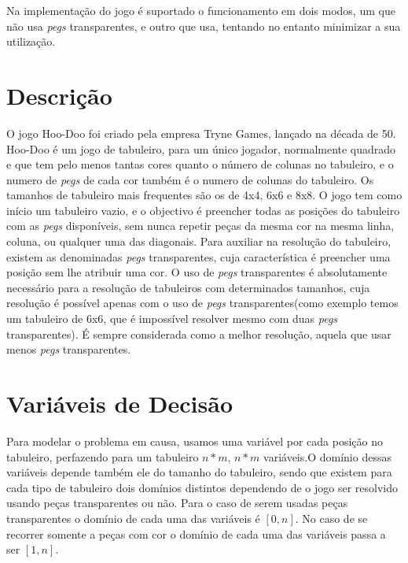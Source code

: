 \documentclass{llncs}
\begin{document}
Na implementa\c{c}\~{a}o do jogo \'{e} suportado o funcionamento em dois modos, um que n\~{a}o usa \emph{pegs} transparentes, e outro que usa, tentando no entanto minimizar a sua utiliza\c{c}\~{a}o.

%

\section{Descri\c{c}\~{a}o}
%
O jogo Hoo-Doo foi criado pela empresa Tryne Games, lan\c{c}ado na d\'{e}cada de 50. Hoo-Doo \'{e} um jogo de tabuleiro, para um \'{u}nico jogador, normalmente quadrado e que tem pelo menos tantas cores quanto o n\'{u}mero de colunas no tabuleiro, e o numero de \emph{\emph{pegs}} de cada cor tamb\'{e}m \'{e} o numero de colunas do tabuleiro. Os tamanhos de tabuleiro mais frequentes s\~{a}o os de 4x4, 6x6 e 8x8. O jogo tem como in\'{i}cio um tabuleiro vazio, e o objectivo \'{e} preencher todas as posi\c{c}\~{o}es do tabuleiro com as \emph{pegs} dispon\'{i}veis, sem nunca repetir pe\c{c}as da mesma cor na mesma linha, coluna, ou qualquer uma das diagonais. Para auxiliar na resolu\c{c}\~{a}o do tabuleiro, existem as denominadas \emph{pegs} transparentes, cuja caracter\'{i}stica \'{e} preencher uma posi\c{c}\~{a}o sem lhe atribuir uma cor. O uso de \emph{pegs} transparentes \'{e} absolutamente necess\'{a}rio para a resolu\c{c}\~{a}o de tabuleiros com determinados tamanhos, cuja resolu\c{c}\~{a}o \'{e} poss\'{i}vel apenas com o uso de \emph{pegs} transparentes(como exemplo temos um tabuleiro de 6x6, que \'{e} imposs\'{i}vel resolver mesmo com duas \emph{pegs} transparentes). \'{E} sempre considerada como a melhor resolu\c{c}\~{a}o, aquela que usar menos \emph{pegs} transparentes.



\section{Vari\'{a}veis de Decis\~{a}o}

Para modelar o problema em causa, usamos uma vari\'{a}vel por cada posi\c{c}\~{a}o no tabuleiro, perfazendo para um tabuleiro $n * m$, $n * m$ vari\'{a}veis.O dom\'{i}nio dessas vari\'{a}veis depende tamb\'{e}m ele do tamanho do tabuleiro, sendo que existem para cada tipo de tabuleiro dois dom\'{i}nios distintos dependendo de o jogo ser resolvido usando pe\c{c}as transparentes ou n\~{a}o.
Para o caso de serem usadas pe\c{c}as transparentes o dom\'{i}nio de cada uma das vari\'{a}veis \'{e} $[0,n]$.
No caso de se recorrer somente a pe\c{c}as com cor o dom\'{i}nio de cada uma das vari\'{a}veis passa a ser $[1,n]$.
\end{document}

